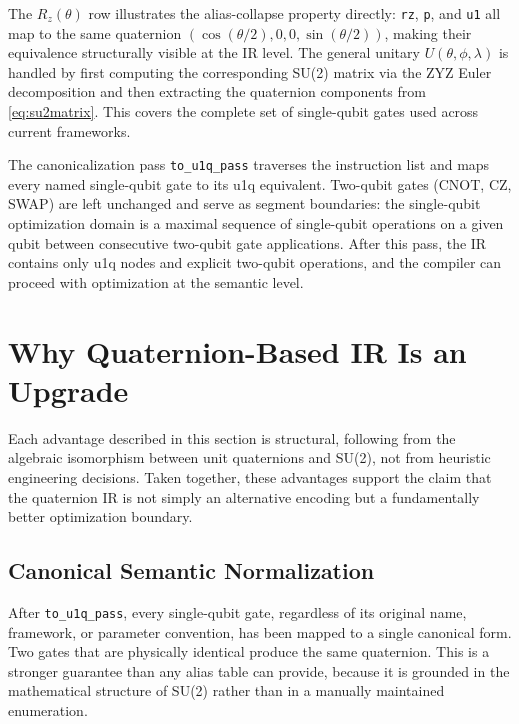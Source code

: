 \documentclass[conference]{IEEEtran}
\begin{document}
The $R_z(\theta)$ row illustrates the alias-collapse property directly: \texttt{rz},
\texttt{p}, and \texttt{u1} all map to the same quaternion $(\cos(\theta/2), 0, 0, \sin(\theta/2))$,
making their equivalence structurally visible at the IR level. The general unitary
$U(\theta, \phi, \lambda)$ is handled by first computing the corresponding SU(2) matrix
via the ZYZ Euler decomposition and then extracting the quaternion components from
\eqref{eq:su2matrix}. This covers the complete set of single-qubit gates used across
current frameworks.

The canonicalization pass \texttt{to\_u1q\_pass} traverses the instruction list and maps
every named single-qubit gate to its u1q equivalent. Two-qubit gates (CNOT, CZ, SWAP)
are left unchanged and serve as segment boundaries: the single-qubit optimization domain
is a maximal sequence of single-qubit operations on a given qubit between consecutive
two-qubit gate applications. After this pass, the IR contains only u1q nodes and explicit
two-qubit operations, and the compiler can proceed with optimization at the semantic level.

\section{Why Quaternion-Based IR Is an Upgrade}

Each advantage described in this section is structural, following from the algebraic
isomorphism between unit quaternions and SU(2), not from heuristic engineering decisions.
Taken together, these advantages support the claim that the quaternion IR is not simply
an alternative encoding but a fundamentally better optimization boundary.

\subsection{Canonical Semantic Normalization}

After \texttt{to\_u1q\_pass}, every single-qubit gate, regardless of its original name,
framework, or parameter convention, has been mapped to a single canonical form. Two
gates that are physically identical produce the same quaternion. This is a stronger
guarantee than any alias table can provide, because it is grounded in the mathematical
structure of SU(2) rather than in a manually maintained enumeration.
\end{document}
